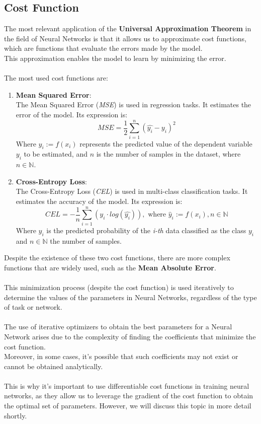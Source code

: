 \documentclass[a4paper, 11pt]{article}
\begin{document}
\subsection{Cost Function}
The most relevant application of the \textbf{Universal Approximation Theorem} in the field of Neural Networks is that it allows us to approximate cost functions, which are functions that evaluate the errors made by the model.\\
This approximation enables the model to learn by minimizing the error.\\
\textcolor{white}{a}\\
The most used cost functions are:
\begin{enumerate}
    \item \textbf{Mean Squared Error}:\\
    The Mean Squared Error (\textit{MSE}) is used in regression tasks. It estimates the error of the model. Its expression is:
    \begin{equation}
        MSE = \frac{1}{2} \sum_{i = 1}^{n} \left( \hat{y_i} - y_i \right)^2
    \end{equation}
    Where $ \hat{y}_i := f(x_i)$ represents the predicted value of the dependent variable $y_i$ to be estimated, and $n$ is the number of samples in the dataset, where $n\in\mathbb{N}$.
    \item \textbf{Cross-Entropy Loss}:\\
    The Cross-Entropy Loss (\textit{CEL}) is used in multi-class classification tasks. It estimates the accuracy of the model. Its expression is:
    \begin{equation}
        CEL = - \frac{1}{n} \sum_{i=1}^n \left(  y_{i} \cdot log(\hat{y_{i}}) \right), \text{ where } \hat{y}_i := f(x_i), n\in \mathbb{N}
    \end{equation}
     Where $ \hat{y}_i$ is the predicted probability of the \textit{i-th} data classified as the class $y_i$ and $n\in\mathbb{N}$ the number of samples.\\
\end{enumerate}
Despite the existence of these two cost functions, there are more complex functions that are widely used, such as the \textbf{Mean Absolute Error}.\\
\textcolor{white}{a}\\
This minimization process (despite the cost function) is used iteratively to determine the values of the parameters in Neural Networks, regardless of the type of task or network.\\
\textcolor{white}{a}\\
The use of iterative optimizers to obtain the best parameters for a Neural Network arises due to the complexity of finding the coefficients that minimize the cost function.\\ 
Moreover, in some cases, it's possible that such coefficients may not exist or cannot be obtained analytically.\\
\textcolor{white}{a}\\
This is why it's important to use differentiable cost functions in training neural networks, as they allow us to leverage the gradient of the cost function to obtain the optimal set of parameters. However, we will discuss this topic in more detail shortly.
\end{document}
